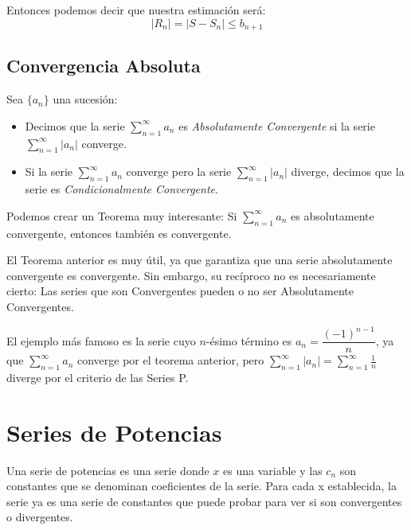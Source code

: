 \documentclass[12pt]{report}                                %
\begin{document}
        Entonces podemos decir que nuestra estimación será:
        \begin{equation}
            |R_n| = |S - S_n| \leq b_{n+1}
        \end{equation}

    \subsection{Convergencia Absoluta}

        Sea $\{a_n\}$ una sucesión:

        \begin{itemize}
            \item Decimos que la serie $\sum_{n=1}^{\infty} a_n$ es \emph{Absolutamente Convergente} si la serie $\sum_{n=1}^{\infty} |a_n|$ converge.

            \item Si la serie $\sum_{n=1}^{\infty} a_n$ converge pero la serie $\sum_{n=1}^{\infty} |a_n|$ diverge, decimos que la serie es \emph{Condicionalmente Convergente}.
        \end{itemize}

        Podemos crear un Teorema muy interesante:
        Si $\sum_{n=1}^{\infty} a_n$ es absolutamente convergente, entonces también es convergente.

        El Teorema anterior es muy útil, ya que garantiza que una serie absolutamente convergente es convergente.
        Sin embargo, su recíproco no es necesariamente cierto: Las series que son Convergentes pueden o no ser Absolutamente Convergentes. 

        El ejemplo más famoso es la serie cuyo $n$-ésimo término es $a_n=\dfrac{(-1)^{n-1}}{n}$, ya que $\sum_{n=1}^{\infty}a_n$ converge por el teorema anterior, pero $\sum_{n=1}^{\infty} |a_n| = \sum_{n=1}^{\infty} \frac{1}{n}$ diverge por el criterio de las Series P.



    \clearpage
    \section{Series de Potencias}

        Una serie de potencias es una serie donde $x$ es una variable
        y las $c_n$ son constantes que se denominan coeficientes de la serie.
        Para cada x establecida, la serie ya es una serie de constantes
        que puede probar para ver si son convergentes o divergentes.
\end{document}
